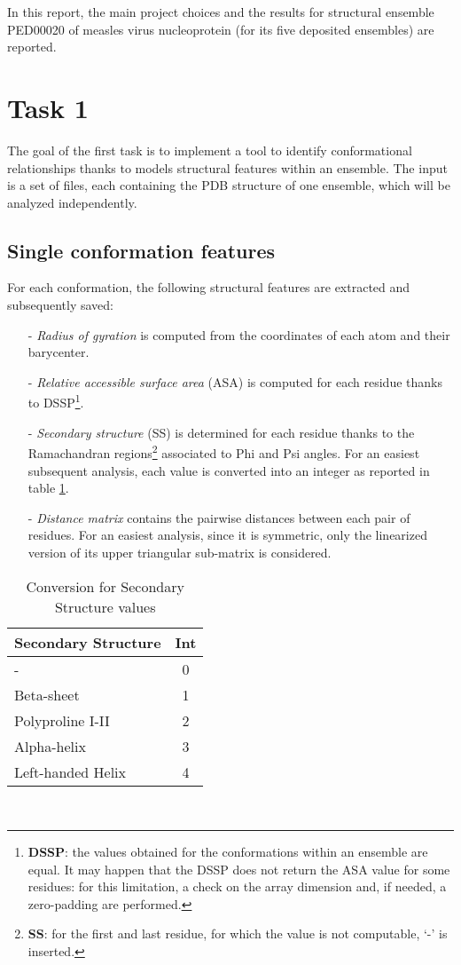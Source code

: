 In this report, the main project choices and the results for structural ensemble PED00020 of measles virus nucleoprotein (for its five deposited ensembles) are reported.

\section{Task 1}\label{sec:task1}
\graphicspath{ {./figures/} }

The goal of the first task is to implement a tool to identify conformational relationships thanks to models structural features within an ensemble. The input is a set of files, each containing the PDB structure of one ensemble, which will be analyzed independently. 

\subsection{Single conformation features}

For each conformation, the following structural features are extracted and subsequently saved:
\begin{itemize}
\item[-] \emph{Radius of gyration} is computed from the coordinates of each atom and their barycenter.
\item[-] \emph{Relative accessible surface area} (ASA) is computed for each residue thanks to DSSP\footnote{\textbf{DSSP}: the values obtained for the conformations within an ensemble are equal. It may happen that the DSSP does not return the ASA value for some residues: for this limitation, a check on the array dimension and, if needed, a zero-padding are performed. }.
\item[-] \emph{Secondary structure} (SS) is determined for each residue thanks to the Ramachandran regions\footnote{\textbf{SS}: for the first and last residue, for which the value is not computable, `-' is inserted.} associated to Phi and Psi angles. For an easiest subsequent analysis, each value is converted into an integer as reported in table \ref{tab:ss}. 
\item[-] \emph{Distance matrix} contains the pairwise distances between each pair of residues. For an easiest analysis, since it is symmetric, only the linearized version of its upper triangular sub-matrix is considered. 
\end{itemize}

\begin{table}[H]
\begin{center}
\begin{tabular}{lc}
\textbf{Secondary Structure} & \textbf{Int}\\
\hline
- & 0\\
\hline
Beta-sheet & 1\\
\hline
Polyproline I-II & 2\\
\hline
Alpha-helix & 3\\
\hline
Left-handed Helix & 4\\
\end{tabular}
\end{center}
\caption{Conversion for Secondary Structure values}~\label{tab:ss}
\end{table}


